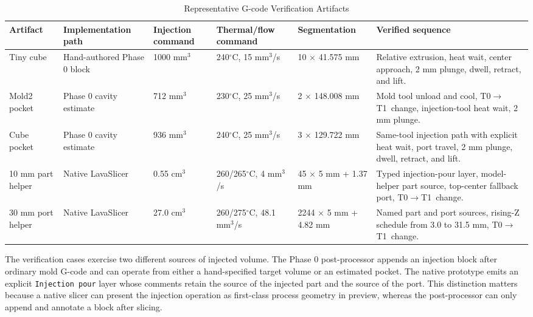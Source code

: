 \documentclass[conference]{IEEEtran}
\newcommand{\toolone}{T0}
\newcommand{\tooltwo}{T1}
\begin{document}
\begin{table}[t]
\caption{Representative G-code Verification Artifacts}
\label{tab:gcodeverify}
\centering
\scriptsize
\setlength{\tabcolsep}{3.1pt}
\begin{tabularx}{\textwidth}{@{}P{0.14\textwidth}P{0.15\textwidth}P{0.12\textwidth}P{0.14\textwidth}P{0.14\textwidth}Y@{}}
\toprule
Artifact & Implementation path & Injection command & Thermal/flow command & Segmentation & Verified sequence \\
\midrule
Tiny cube & Hand-authored Phase 0 block & 1000 mm$^3$ & 240$^\circ$C, 15 mm$^3$/s & 10 $\times$ 41.575 mm & Relative extrusion, heat wait, center approach, 2 mm plunge, dwell, retract, and lift. \\
Mold2 pocket & Phase 0 cavity estimate & 712 mm$^3$ & 230$^\circ$C, 25 mm$^3$/s & 2 $\times$ 148.008 mm & Mold tool unload and cool, \toolone$\rightarrow$\tooltwo\ change, injection-tool heat wait, 2 mm plunge. \\
Cube pocket & Phase 0 cavity estimate & 936 mm$^3$ & 240$^\circ$C, 25 mm$^3$/s & 3 $\times$ 129.722 mm & Same-tool injection path with explicit heat wait, port travel, 2 mm plunge, dwell, retract, and lift. \\
10 mm part helper & Native LavaSlicer & 0.55 cm$^3$ & 260/265$^\circ$C, 4 mm$^3$/s & 45 $\times$ 5 mm + 1.37 mm & Typed injection-pour layer, model-helper part source, top-center fallback port, \toolone$\rightarrow$\tooltwo\ change. \\
30 mm port helper & Native LavaSlicer & 27.0 cm$^3$ & 260/275$^\circ$C, 48.1 mm$^3$/s & 2244 $\times$ 5 mm + 4.82 mm & Named part and port sources, rising-Z schedule from 3.0 to 31.5 mm, \toolone$\rightarrow$\tooltwo\ change. \\
\bottomrule
\end{tabularx}
\end{table}

The verification cases exercise two different sources of injected volume. The Phase 0 post-processor appends an injection block after ordinary mold G-code and can operate from either a hand-specified target volume or an estimated pocket. The native prototype emits an explicit \texttt{Injection pour} layer whose comments retain the source of the injected part and the source of the port. This distinction matters because a native slicer can present the injection operation as first-class process geometry in preview, whereas the post-processor can only append and annotate a block after slicing.
\end{document}
